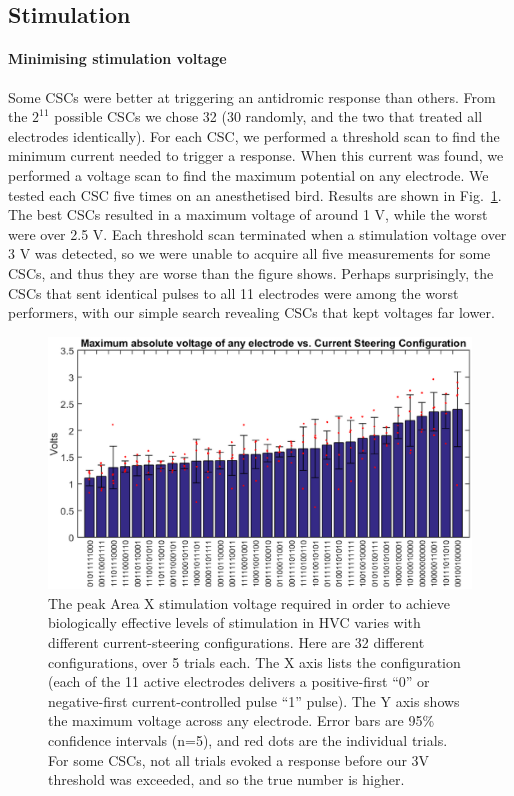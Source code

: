 \documentclass[10pt,letterpaper]{article}
\newcommand\fig[1]{Fig.~\ref{#1}}
\renewcommand{\subsubsection}[1]{\paragraph{#1}}
\begin{document}
\subsection{Stimulation}

\subsubsection{Minimising stimulation voltage}

Some CSCs were better at triggering an antidromic response than others.  From the $2^{11}$ possible CSCs we chose 32 (30 randomly, and the two that treated all electrodes identically).  For each CSC, we performed a threshold scan to find the minimum current needed to trigger a response.  When this current was found, we performed a voltage scan to find the maximum potential on any electrode.  We tested each CSC five times on an anesthetised bird.  Results are shown in \fig{fig:VoltageVsCSC}.  The best CSCs resulted in a maximum voltage of around 1 V, while the worst were over 2.5 V.  Each threshold scan terminated when a stimulation voltage over 3 V was detected, so we were unable to acquire all five measurements for some CSCs, and thus they are worse than the figure shows.  Perhaps surprisingly, the CSCs that sent identical pulses to all 11 electrodes were among the worst performers, with our simple search revealing CSCs that kept voltages far lower.

\begin{figure}
  \includegraphics[width=\textwidth]{VoltageVsCSC}
  \caption{The peak Area X stimulation voltage required in order to achieve biologically effective levels of stimulation in HVC varies with different current-steering configurations.  Here are 32 different configurations, over 5 trials each.  The X axis lists the configuration (each of the 11 active electrodes delivers a positive-first ``0'' or negative-first current-controlled pulse ``1'' pulse).  The Y axis shows the maximum voltage across any electrode.  Error bars are 95\% confidence intervals (n=5), and red dots are the individual trials.  For some CSCs, not all trials evoked a response before our 3V threshold was exceeded, and so the true number is higher.}
  \label{fig:VoltageVsCSC}
\end{figure}
\end{document}
